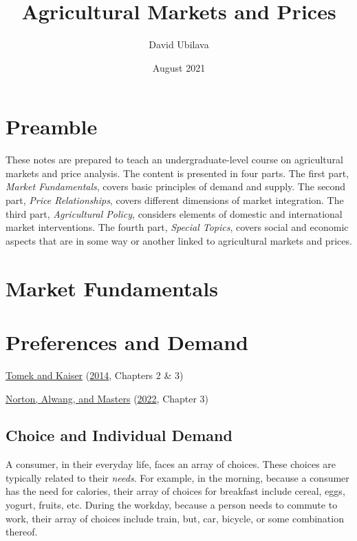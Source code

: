 \documentclass[
  oneside]{book}
\title{Agricultural Markets and Prices}
\author{David Ubilava}
\date{August 2021}
\begin{document}
\maketitle

{
\setcounter{tocdepth}{1}
\tableofcontents
}
\hypertarget{preamble}{%
\chapter*{Preamble}\label{preamble}}

These notes are prepared to teach an undergraduate-level course on agricultural markets and price analysis. The content is presented in four parts. The first part, \emph{Market Fundamentals}, covers basic principles of demand and supply. The second part, \emph{Price Relationships}, covers different dimensions of market integration. The third part, \emph{Agricultural Policy}, considers elements of domestic and international market interventions. The fourth part, \emph{Special Topics}, covers social and economic aspects that are in some way or another linked to agricultural markets and prices.

\hypertarget{market-fundamentals}{%
\chapter*{Market Fundamentals}\label{market-fundamentals}}

\hypertarget{preferences-and-demand}{%
\chapter{Preferences and Demand}\label{preferences-and-demand}}

\protect\hyperlink{ref-tomek2014}{Tomek and Kaiser} (\protect\hyperlink{ref-tomek2014}{2014}, Chapters 2 \& 3)

\protect\hyperlink{ref-norton2022}{Norton, Alwang, and Masters} (\protect\hyperlink{ref-norton2022}{2022}, Chapter 3)

\hypertarget{choice-and-individual-demand}{%
\section{Choice and Individual Demand}\label{choice-and-individual-demand}}

A consumer, in their everyday life, faces an array of choices. These choices are typically related to their \emph{needs}. For example, in the morning, because a consumer has the need for calories, their array of choices for breakfast include cereal, eggs, yogurt, fruits, etc. During the workday, because a person needs to commute to work, their array of choices include train, but, car, bicycle, or some combination thereof.
\end{document}
